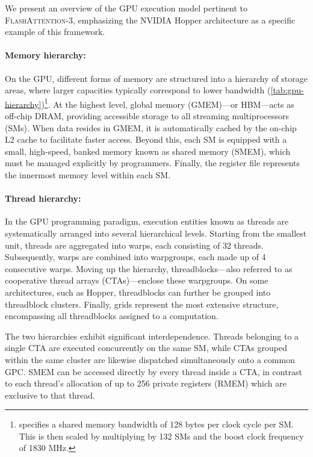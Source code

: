 We present an overview of the GPU execution model pertinent to \textsc{FlashAttention-3}, emphasizing the NVIDIA Hopper architecture as a specific example of this framework.

\paragraph{Memory hierarchy:} On the GPU, different forms of memory are structured into a hierarchy of storage areas, where larger capacities typically correspond to lower bandwidth (\cref{tab:gpu-hierarchy})\footnote{\citet{luo2024benchmarking} specifies a shared memory bandwidth of 128 bytes per clock cycle per SM. This is then scaled by multiplying by 132 SMs and the boost clock frequency of 1830 MHz.}. At the highest level, global memory (GMEM)—or HBM—acts as off-chip DRAM, providing accessible storage to all streaming multiprocessors (SMs). When data resides in GMEM, it is automatically cached by the on-chip L2 cache to facilitate faster access. Beyond this, each SM is equipped with a small, high-speed, banked memory known as shared memory (SMEM), which must be managed explicitly by programmers. Finally, the register file represents the innermost memory level within each SM.

\paragraph{Thread hierarchy:} In the GPU programming paradigm, execution entities known as threads are systematically arranged into several hierarchical levels. Starting from the smallest unit, threads are aggregated into warps, each consisting of 32 threads. Subsequently, warps are combined into warpgroups, each made up of 4 consecutive warps. Moving up the hierarchy, threadblocks—also referred to as cooperative thread arrays (CTAs)—enclose these warpgroups. On some architectures, such as Hopper, threadblocks can further be grouped into threadblock clusters. Finally, grids represent the most extensive structure, encompassing all threadblocks assigned to a computation.

The two hierarchies exhibit significant interdependence. Threads belonging to a single CTA are executed concurrently on the same SM, while CTAs grouped within the same cluster are likewise dispatched simultaneously onto a common GPC. SMEM can be accessed directly by every thread inside a CTA, in contrast to each thread’s allocation of up to 256 private registers (RMEM) which are exclusive to that thread.

